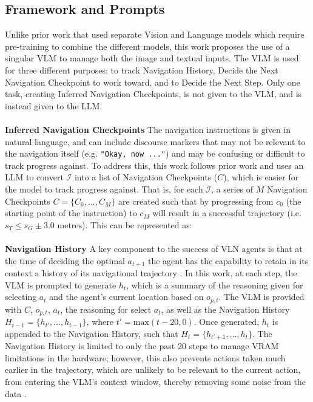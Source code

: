 \documentclass{svproc}
\begin{document}
\subsection{Framework and Prompts}
    Unlike prior work that used separate Vision and Language models \cite{zhou2023navgptexplicitreasoningvisionandlanguage, 51647} which require pre-training to combine the different models, this work proposes the use of a singular VLM to manage both the image and textual inputs. The VLM is used for three different purposes: to track Navigation History, Decide the Next Navigation Checkpoint to work toward, and to Decide the Next Step. Only one task, creating Inferred Navigation Checkpoints, is not given to the VLM, and is instead given to the LLM. 
    \\ \\
    \textbf{Inferred Navigation Checkpoints}  The navigation instructions is given in natural language, and can include discourse markers that may not be relevant to the navigation itself (e.g. \texttt{"Okay, now ..."}) and may be confusing or difficult to track progress against. To address this, this work follows prior work \cite{open-nav,navgpt2} and uses an LLM to convert $\mathcal{I}$ into a list of Navigation Checkpoints ($C$), which is easier for the model to track progress against. That is, for each $\mathcal{I}$, a series of $M$ Navigation Checkpoints $C = \{C_0, ..., C_M\}$ are created such that by progressing from $c_0$ (the starting point of the instruction) to $c_M$ will result in a successful trajectory (i.e. $s_T \leq s_G\pm 3.0 \text{ metres}$). This can be represented as:
    \\ \\
    \textbf{Navigation History}  A key component to the success of VLN agents is that at the time of deciding the optimal $a_{t+1}$ the agent has the capability to retain in its context a history of its navigational trajectory \cite{chen2021_HAMT, HE2024110511_MemoryAdaptiveVLN}. In this work, at each step, the VLM is prompted to generate $h_t$, which is a summary of the reasoning given for selecting $a_t$ and the agent's current location based on $o_{p,t}$. The VLM is provided with $C$, $o_{p,t}$, ${a_t}$, the reasoning for select ${a_t}$, as well as the Navigation History $H_{t-1} = \{h_{t'}, ..., h_{t-1}\}$, where $t' = \text{max}(t-20, 0)$. Once generated, $h_t$ is appended to the Navigation History, such that $H_t = \{h_{t'+1}, ..., h_t\}$. The Navigation History is limited to only the past 20 steps to manage VRAM limitations in the hardware; however, this also prevents actions taken much earlier in the trajectory, which are unlikely to be relevant to the current action, from entering the VLM's context window, thereby removing some noise from the data \cite{HE2024110511_MemoryAdaptiveVLN}.
\end{document}
